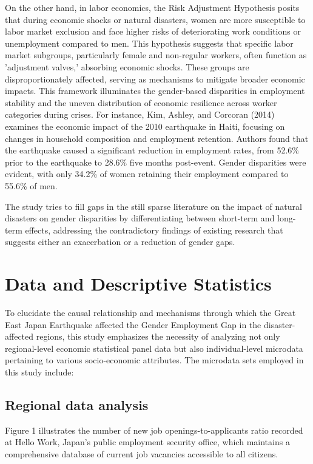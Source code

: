 \documentclass[12pt,halfline,a4paper]{ouparticle}
\begin{document}
On the other hand, in labor economics, the Risk Adjustment Hypothesis posits that during economic shocks or natural disasters, women are more susceptible to labor market exclusion and face higher risks of deteriorating work conditions or unemployment compared to men. This hypothesis suggests that specific labor market subgroups, particularly female and non-regular workers, often function as 'adjustment valves,' absorbing economic shocks. These groups are disproportionately affected, serving as mechanisms to mitigate broader economic impacts. This framework illuminates the gender-based disparities in employment stability and the uneven distribution of economic resilience across worker categories during crises. For instance, Kim, Ashley, and Corcoran (2014) examines the economic impact of the 2010 earthquake in Haiti, focusing on changes in household composition and employment retention. Authors found that the earthquake caused a significant reduction in employment rates, from 52.6\% prior to the earthquake to 28.6\% five months post-event. Gender disparities were evident, with only 34.2\% of women retaining their employment compared to 55.6\% of men. 


The study tries to fill gaps in the still sparse literature on the impact of natural disasters on gender disparities by differentiating between short-term and long-term effects, addressing the contradictory findings of existing research that suggests either an exacerbation or a reduction of gender gaps.



\section{Data and Descriptive Statistics}
\label{sec4}

To elucidate the causal relationship and mechanisms through which the Great East Japan Earthquake affected the Gender Employment Gap in the disaster-affected regions, this study emphasizes the necessity of analyzing not only regional-level economic statistical panel data but also individual-level microdata pertaining to various socio-economic attributes. The microdata sets employed in this study include:

\subsection{Regional data analysis}
\label{sec4.1}

Figure 1 illustrates the number of new job openings-to-applicants ratio recorded at Hello Work, Japan’s public employment security office, which maintains a comprehensive database of current job vacancies accessible to all citizens. 
\end{document}
